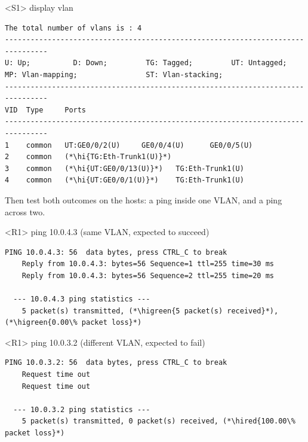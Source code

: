 \begin{vrpbox}{<S1> display vlan}
\begin{lstlisting}[style=vrp]
The total number of vlans is : 4
--------------------------------------------------------------------------------
U: Up;          D: Down;         TG: Tagged;         UT: Untagged;
MP: Vlan-mapping;                ST: Vlan-stacking;
--------------------------------------------------------------------------------
VID  Type     Ports
--------------------------------------------------------------------------------
1    common   UT:GE0/0/2(U)     GE0/0/4(U)      GE0/0/5(U)
2    common   (*\hi{TG:Eth-Trunk1(U)}*)
3    common   (*\hi{UT:GE0/0/13(U)}*)   TG:Eth-Trunk1(U)
4    common   (*\hi{UT:GE0/0/1(U)}*)    TG:Eth-Trunk1(U)
\end{lstlisting}
\end{vrpbox}

Then test both outcomes on the hosts: a ping inside one VLAN, and a ping
across two.

\begin{vrpbox}{<R1> ping 10.0.4.3 \quad (same VLAN, expected to succeed)}
\begin{lstlisting}[style=vrp]
  PING 10.0.4.3: 56  data bytes, press CTRL_C to break
    Reply from 10.0.4.3: bytes=56 Sequence=1 ttl=255 time=30 ms
    Reply from 10.0.4.3: bytes=56 Sequence=2 ttl=255 time=20 ms

  --- 10.0.4.3 ping statistics ---
    5 packet(s) transmitted, (*\higreen{5 packet(s) received}*), (*\higreen{0.00\% packet loss}*)
\end{lstlisting}
\end{vrpbox}

\begin{vrpbox}{<R1> ping 10.0.3.2 \quad (different VLAN, expected to fail)}
\begin{lstlisting}[style=vrp]
  PING 10.0.3.2: 56  data bytes, press CTRL_C to break
    Request time out
    Request time out

  --- 10.0.3.2 ping statistics ---
    5 packet(s) transmitted, 0 packet(s) received, (*\hired{100.00\% packet loss}*)
\end{lstlisting}
\end{vrpbox}


